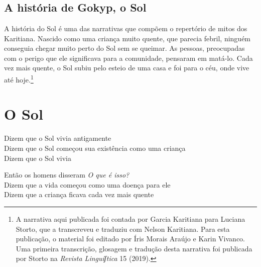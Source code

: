 \chapter{}

\section{A história de Gokyp, o Sol} A história do Sol é uma das narrativas que compõem o repertório de mitos dos Karitiana. Nascido como uma criança muito quente, que parecia febril, ninguém conseguia chegar muito perto do Sol sem se queimar. As
pessoas, preocupadas com o perigo que ele significava para a comunidade,
pensaram em matá-lo. Cada vez mais quente, o Sol subiu pelo esteio de
uma casa e foi para o céu, onde vive até hoje.\footnote{A narrativa aqui publicada foi contada por Garcia Karitiana para Luciana Storto, que a transcreveu e traduziu com Nelson Karitiana. Para esta
publicação, o material foi editado por Íris Morais Araújo e Karin
Vivanco. Uma primeira transcrição, glosagem e tradução desta narrativa foi publicada por Storto na \textit{Revista Linguíʃtica} 15 (2019).}


\chapter{O Sol}

\begin{linenumbers}\begingroup\raggedright
\noindent Dizem que o Sol vivia antigamente\\
Dizem que o Sol começou sua existência como uma criança\\
Dizem que o Sol vivia
\end{linenumbers}\endgroup

\bigskip

\begin{linenumbers}\begingroup\raggedright
\noindent Então os homens disseram \textit{O que é isso?}\\
Dizem que a vida começou como uma doença para ele\\
Dizem que a criança ficava cada vez mais quente
\end{linenumbers}\endgroup

